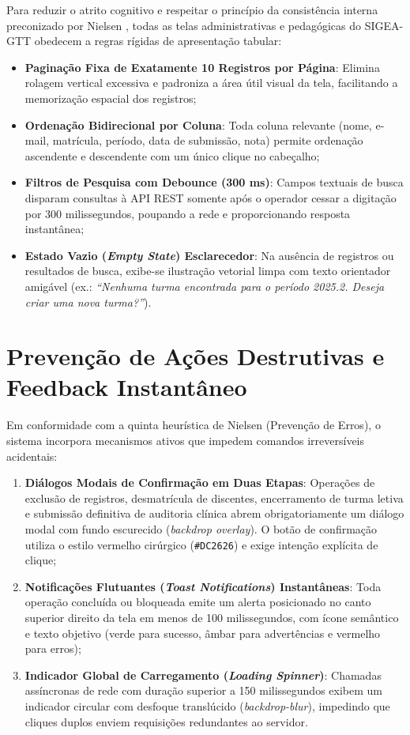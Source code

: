 Para reduzir o atrito cognitivo e respeitar o princípio da consistência interna preconizado por Nielsen \cite{nielsen1994}, todas as telas administrativas e pedagógicas do SIGEA-GTT obedecem a regras rígidas de apresentação tabular:
\begin{itemize}
    \item \textbf{Paginação Fixa de Exatamente 10 Registros por Página}: Elimina rolagem vertical excessiva e padroniza a área útil visual da tela, facilitando a memorização espacial dos registros;
    \item \textbf{Ordenação Bidirecional por Coluna}: Toda coluna relevante (nome, e-mail, matrícula, período, data de submissão, nota) permite ordenação ascendente e descendente com um único clique no cabeçalho;
    \item \textbf{Filtros de Pesquisa com Debounce (300 ms)}: Campos textuais de busca disparam consultas à API REST somente após o operador cessar a digitação por 300 milissegundos, poupando a rede e proporcionando resposta instantânea;
    \item \textbf{Estado Vazio (\textit{Empty State}) Esclarecedor}: Na ausência de registros ou resultados de busca, exibe-se ilustração vetorial limpa com texto orientador amigável (ex.: \textit{``Nenhuma turma encontrada para o período 2025.2. Deseja criar uma nova turma?''}).
\end{itemize}

\section{Prevenção de Ações Destrutivas e Feedback Instantâneo}
\label{sec_prevencao_erros}

Em conformidade com a quinta heurística de Nielsen (Prevenção de Erros), o sistema incorpora mecanismos ativos que impedem comandos irreversíveis acidentais:
\begin{enumerate}
    \item \textbf{Diálogos Modais de Confirmação em Duas Etapas}: Operações de exclusão de registros, desmatrícula de discentes, encerramento de turma letiva e submissão definitiva de auditoria clínica abrem obrigatoriamente um diálogo modal com fundo escurecido (\textit{backdrop overlay}). O botão de confirmação utiliza o estilo vermelho cirúrgico (\texttt{\#DC2626}) e exige intenção explícita de clique;
    \item \textbf{Notificações Flutuantes (\textit{Toast Notifications}) Instantâneas}: Toda operação concluída ou bloqueada emite um alerta posicionado no canto superior direito da tela em menos de 100 milissegundos, com ícone semântico e texto objetivo (verde para sucesso, âmbar para advertências e vermelho para erros);
    \item \textbf{Indicador Global de Carregamento (\textit{Loading Spinner})}: Chamadas assíncronas de rede com duração superior a 150 milissegundos exibem um indicador circular com desfoque translúcido (\textit{backdrop-blur}), impedindo que cliques duplos enviem requisições redundantes ao servidor.
\end{enumerate}

